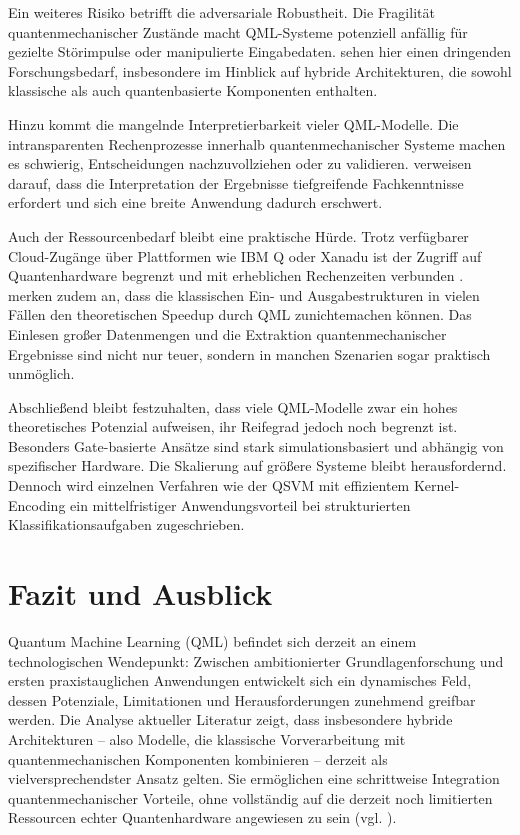 Ein weiteres Risiko betrifft die adversariale Robustheit. Die Fragilität quantenmechanischer Zustände macht QML-Systeme potenziell anfällig für gezielte Störimpulse oder manipulierte Eingabedaten. \cite{gujjuQuantumMachineLearning2024} sehen hier einen dringenden Forschungsbedarf, insbesondere im Hinblick auf hybride Architekturen, die sowohl klassische als auch quantenbasierte Komponenten enthalten.

Hinzu kommt die mangelnde Interpretierbarkeit vieler QML-Modelle. Die intransparenten Rechenprozesse innerhalb quantenmechanischer Systeme machen es schwierig, Entscheidungen nachzuvollziehen oder zu validieren. \cite{tychola_quantum_2023} verweisen darauf, dass die Interpretation der Ergebnisse tiefgreifende Fachkenntnisse erfordert und sich eine breite Anwendung dadurch erschwert.

Auch der Ressourcenbedarf bleibt eine praktische Hürde. Trotz verfügbarer Cloud-Zugänge über Plattformen wie IBM Q oder Xanadu ist der Zugriff auf Quantenhardware begrenzt und mit erheblichen Rechenzeiten verbunden \cite{peral-garciaSystematicLiteratureReview2024}. \cite{zhangRecentAdvancesQuantum2020} merken zudem an, dass die klassischen Ein- und Ausgabestrukturen in vielen Fällen den theoretischen Speedup durch QML zunichtemachen können. Das Einlesen großer Datenmengen und die Extraktion quantenmechanischer Ergebnisse sind nicht nur teuer, sondern in manchen Szenarien sogar praktisch unmöglich.

Abschließend bleibt festzuhalten, dass viele QML-Modelle zwar ein hohes theoretisches Potenzial aufweisen, ihr Reifegrad jedoch noch begrenzt ist. Besonders Gate-basierte Ansätze sind stark simulationsbasiert und abhängig von spezifischer Hardware. Die Skalierung auf größere Systeme bleibt herausfordernd. Dennoch wird einzelnen Verfahren wie der QSVM mit effizientem Kernel-Encoding ein mittelfristiger Anwendungsvorteil bei strukturierten Klassifikationsaufgaben zugeschrieben.


\section{Fazit und Ausblick}
Quantum Machine Learning (QML) befindet sich derzeit an einem technologischen Wendepunkt: Zwischen ambitionierter Grundlagenforschung und ersten praxistauglichen Anwendungen entwickelt sich ein dynamisches Feld, dessen Potenziale, Limitationen und Herausforderungen zunehmend greifbar werden. Die Analyse aktueller Literatur zeigt, dass insbesondere hybride Architekturen – also Modelle, die klassische Vorverarbeitung mit quantenmechanischen Komponenten kombinieren – derzeit als vielversprechendster Ansatz gelten. Sie ermöglichen eine schrittweise Integration quantenmechanischer Vorteile, ohne vollständig auf die derzeit noch limitierten Ressourcen echter Quantenhardware angewiesen zu sein
(vgl. \cite{liuQuantumTrainRethinkingHybrid2024, peral-garciaSystematicLiteratureReview2024}).

